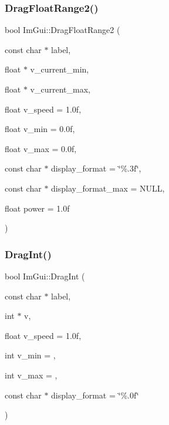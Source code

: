 \subsubsection{\texorpdfstring{Drag\+Float\+Range2()}{DragFloatRange2()}}
{\footnotesize\ttfamily bool Im\+Gui\+::\+Drag\+Float\+Range2 (\begin{DoxyParamCaption}\item[{const char $\ast$}]{label,  }\item[{float $\ast$}]{v\+\_\+current\+\_\+min,  }\item[{float $\ast$}]{v\+\_\+current\+\_\+max,  }\item[{float}]{v\+\_\+speed = {\ttfamily 1.0f},  }\item[{float}]{v\+\_\+min = {\ttfamily 0.0f},  }\item[{float}]{v\+\_\+max = {\ttfamily 0.0f},  }\item[{const char $\ast$}]{display\+\_\+format = {\ttfamily \char`\"{}\%.3f\char`\"{}},  }\item[{const char $\ast$}]{display\+\_\+format\+\_\+max = {\ttfamily NULL},  }\item[{float}]{power = {\ttfamily 1.0f} }\end{DoxyParamCaption})}

\mbox{\label{namespace_im_gui_abc3ac739a79de5897b61df4e6764fc9e}} 
\subsubsection{\texorpdfstring{Drag\+Int()}{DragInt()}}
{\footnotesize\ttfamily bool Im\+Gui\+::\+Drag\+Int (\begin{DoxyParamCaption}\item[{const char $\ast$}]{label,  }\item[{int $\ast$}]{v,  }\item[{float}]{v\+\_\+speed = {\ttfamily 1.0f},  }\item[{int}]{v\+\_\+min = {},  }\item[{int}]{v\+\_\+max = {},  }\item[{const char $\ast$}]{display\+\_\+format = {\ttfamily \char`\"{}\%.0f\char`\"{}} }\end{DoxyParamCaption})}

\mbox{\label{namespace_im_gui_aa74f28deeb62f0aa96e1c34b27e7bcd9}} 
